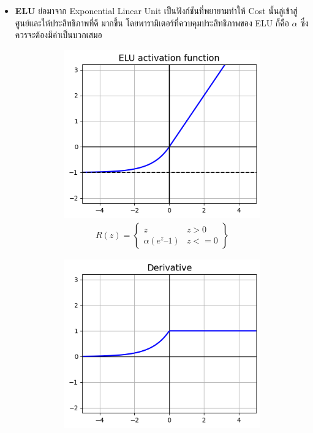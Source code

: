 \begin{itemize}
    \item \textbf{ELU} ย่อมาจาก Exponential Linear Unit เป็นฟังก์ชันที่พยายามทำให้ Cost นั้นลู่เข้าสู่ศูนย์และให้ประสิทธิภาพที่ดี%
    มากขึ้น โดยพารามิเตอร์ที่ควบคุมประสิทธิภาพของ ELU ก็คือ $\alpha$ ซึ่งควรจะต้องมีค่าเป็นบวกเสมอ
    \begin{figure}[H]
        \centering
        \begin{subfigure}{0.5\textwidth}
            \centering
            \includegraphics[width=0.9\linewidth]{fig/actfunc_elu.png}
            \caption{%
                \begin{equation}
                    \begin{split}R(z) = \begin{Bmatrix} z & z > 0 \\
                        \alpha (e^z – 1) & z <= 0 \end{Bmatrix}\end{split}
                \end{equation}
            }
            \label{fig:actfunc_elu}
        \end{subfigure}%
        \begin{subfigure}{0.5\textwidth}
            \centering
            \includegraphics[width=0.9\linewidth]{fig/actfunc_elu_der.png}

\end{subfigure}
\end{figure}
\end{itemize}
